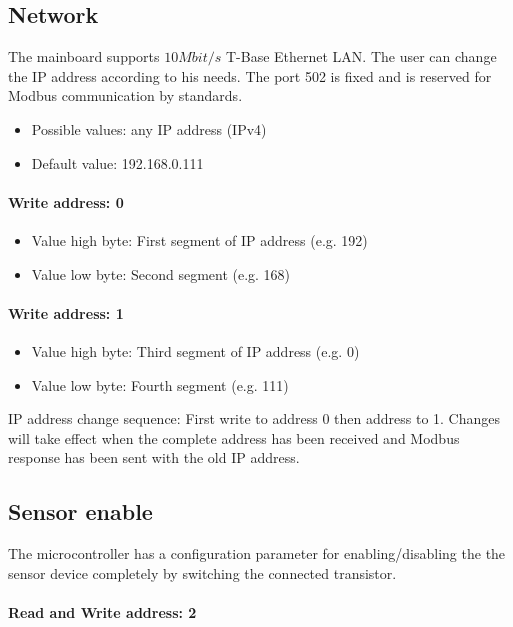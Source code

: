 \subsection{Network}
The mainboard supports $10 Mbit/s$ T-Base Ethernet LAN. The user can change the IP address according to his needs. The port 502 is fixed and is reserved for Modbus communication by standards.

\begin{itemize}
    \item Possible values: any IP address (IPv4)
    \item Default value: 192.168.0.111
\end{itemize}

\paragraph{Write address: 0} 
\begin{itemize}
    \item Value high byte: First segment of IP address (e.g. 192)
    \item Value low byte: Second segment (e.g. 168)
\end{itemize}

\paragraph{Write address: 1} 
\begin{itemize}
    \item Value high byte: Third segment of IP address (e.g. 0)
    \item  Value low byte: Fourth segment (e.g. 111)
\end{itemize}

IP address change sequence: First write to address 0 then address to 1. Changes will take effect when the complete address has been received and Modbus response has been sent with the old IP address.

\subsection{Sensor enable}
\label{sec:sensor_enable}
The microcontroller has a configuration parameter for enabling/disabling the the sensor device completely by switching the connected transistor. 

\paragraph{Read and Write address: 2}
